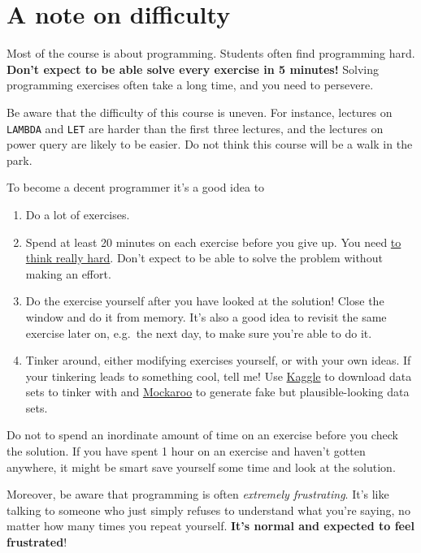 \documentclass[
  letterpaper,
  DIV=11,
  numbers=noendperiod]{scrreprt}
\providecommand{\tightlist}{%
  \setlength{\itemsep}{0pt}\setlength{\parskip}{0pt}}\usepackage{longtable,booktabs,array}
\begin{document}
\hypertarget{a-note-on-difficulty}{%
\section*{A note on difficulty}\label{a-note-on-difficulty}}


Most of the course is about programming. Students often find programming
hard. \textbf{Don't expect to be able solve every exercise in 5
minutes!} Solving programming exercises often take a long time, and you
need to persevere.

Be aware that the difficulty of this course is uneven. For instance,
lectures on \texttt{LAMBDA} and \texttt{LET} are harder than the first
three lectures, and the lectures on power query are likely to be easier.
Do not think this course will be a walk in the park.

To become a decent programmer it's a good idea to

\begin{enumerate}
\def\labelenumi{\arabic{enumi}.}
\tightlist
\item
  Do a lot of exercises.
\item
  Spend at least 20 minutes on each exercise before you give up. You
  need \href{https://www.benkuhn.net/thinkrealhard/}{to think really
  hard}. Don't expect to be able to solve the problem without making an
  effort.
\item
  Do the exercise yourself after you have looked at the solution! Close
  the window and do it from memory. It's also a good idea to revisit the
  same exercise later on, e.g.~the next day, to make sure you're able to
  do it.
\item
  Tinker around, either modifying exercises yourself, or with your own
  ideas. If your tinkering leads to something cool, tell me! Use
  \href{https://www.kaggle.com/}{Kaggle} to download data sets to tinker
  with and \href{https://mockaroo.com/}{Mockaroo} to generate fake but
  plausible-looking data sets.
\end{enumerate}

Do not to spend an inordinate amount of time on an exercise before you
check the solution. If you have spent 1 hour on an exercise and haven't
gotten anywhere, it might be smart save yourself some time and look at
the solution.

Moreover, be aware that programming is often \emph{extremely
frustrating}. It's like talking to someone who just simply refuses to
understand what you're saying, no matter how many times you repeat
yourself. \textbf{It's normal and expected to feel frustrated}!
\end{document}
